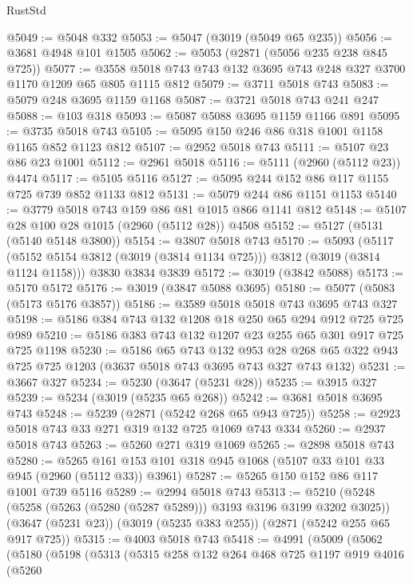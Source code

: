 \begin{lexlean}{RustStd}
\begin{coremodule}
@5049 := @5048 @332
@5053 := @5047 (@3019 (@5049 @65 @235))
@5056 := @3681 @4948 @101 @1505
@5062 := @5053 (@2871 (@5056 @235 @238 @845 @725))
@5077 := @3558 @5018 @743 @743 @132 @3695 @743 @248 @327 @3700 @1170 @1209 @65 @805 @1115 @812
@5079 := @3711 @5018 @743
@5083 := @5079 @248 @3695 @1159 @1168
@5087 := @3721 @5018 @743 @241 @247
@5088 := @103 @318
@5093 := @5087 @5088 @3695 @1159 @1166 @891
@5095 := @3735 @5018 @743
@5105 := @5095 @150 @246 @86 @318 @1001 @1158 @1165 @852 @1123 @812
@5107 := @2952 @5018 @743
@5111 := @5107 @23 @86 @23 @1001
@5112 := @2961 @5018
@5116 := @5111 (@2960 (@5112 @23)) @4474
@5117 := @5105 @5116
@5127 := @5095 @244 @152 @86 @117 @1155 @725 @739 @852 @1133 @812
@5131 := @5079 @244 @86 @1151 @1153
@5140 := @3779 @5018 @743 @159 @86 @81 @1015 @866 @1141 @812
@5148 := @5107 @28 @100 @28 @1015 (@2960 (@5112 @28)) @4508
@5152 := @5127 (@5131 (@5140 @5148 @3800))
@5154 := @3807 @5018 @743
@5170 := @5093
    (@5117 (@5152 @5154 @3812 (@3019 (@3814 @1134 @725))) @3812 (@3019 (@3814 @1124 @1158)))
    @3830
    @3834
    @3839
@5172 := @3019 (@3842 @5088)
@5173 := @5170 @5172
@5176 := @3019 (@3847 @5088 @3695)
@5180 := @5077 (@5083 (@5173 @5176 @3857))
@5186 := @3589 @5018 @5018 @743 @3695 @743 @327
@5198 := @5186 @384 @743 @132 @1208 @18 @250 @65 @294 @912 @725 @725 @989
@5210 := @5186 @383 @743 @132 @1207 @23 @255 @65 @301 @917 @725 @725 @1198
@5230 := @5186
    @65
    @743
    @132
    @953
    @28
    @268
    @65
    @322
    @943
    @725
    @725
    @1203
    (@3637 @5018 @743 @3695 @743 @327 @743 @132)
@5231 := @3667 @327
@5234 := @5230 (@3647 (@5231 @28))
@5235 := @3915 @327
@5239 := @5234 (@3019 (@5235 @65 @268))
@5242 := @3681 @5018 @3695 @743
@5248 := @5239 (@2871 (@5242 @268 @65 @943 @725))
@5258 := @2923 @5018 @743 @33 @271 @319 @132 @725 @1069 @743 @334
@5260 := @2937 @5018 @743
@5263 := @5260 @271 @319 @1069
@5265 := @2898 @5018 @743
@5280 := @5265 @161 @153 @101 @318 @945 @1068 (@5107 @33 @101 @33 @945 (@2960 (@5112 @33)) @3961)
@5287 := @5265 @150 @152 @86 @117 @1001 @739 @5116
@5289 := @2994 @5018 @743
@5313 := @5210
    (@5248 (@5258 (@5263 (@5280 (@5287 @5289))) @3193 @3196 @3199 @3202 @3025))
    (@3647 (@5231 @23))
    (@3019 (@5235 @383 @255))
    (@2871 (@5242 @255 @65 @917 @725))
@5315 := @4003 @5018 @743
@5418 := @4991
    (@5009
      (@5062
        (@5180
          (@5198
            (@5313
              (@5315
                @258
                @132
                @264
                @468
                @725
                @1197
                @919
                @4016
                (@5260

\end{coremodule}
\end{lexlean}
